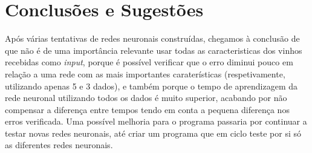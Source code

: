 \documentclass{article}
\begin{document}
\section{Conclusões e Sugestões}
Após várias tentativas de redes neuronais construídas, chegamos à conclusão de que não é de uma importância relevante usar todas as caracteristicas dos vinhos recebidas como \textit{input}, porque é possível verificar que o erro diminui pouco em relação a uma rede com as mais importantes caraterísticas (respetivamente, utilizando apenas 5 e 3 dados), e também porque o tempo de aprendizagem da rede neuronal utilizando todos os dados é muito superior, acabando por não compensar a diferença entre tempos tendo em conta a pequena diferença nos erros verificada. Uma possível melhoria para o programa passaria por continuar a testar novas redes neuronais, até criar um programa que em ciclo teste por si só as diferentes redes neuronais.
\vspace*{\fill}
\end{document}
